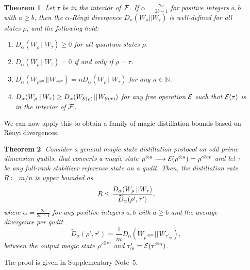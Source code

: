 \documentclass[
onecolumn,
superscriptaddress
]{revtex4-1}
\newtheorem{theorem}{Theorem}
\def\E{{\cal E}}
\def\F{{\cal F}}
\begin{document}
\begin{theorem}\label{thm:Da_props} 
	Let $\tau$ be in the interior of $\F$. 
	If $\alpha = \frac{2a}{2b-1}$ for positive integers $a,b$ with $a \geq b$, then the $\alpha$-R\'{e}nyi divergence $D_\alpha(W_\rho || W_\tau)$ is well-defined for all states $\rho$, and the following hold:
\begin{enumerate}
	\item $D_\alpha(W_\rho \hspace{1pt}||\hspace{1pt} W_\tau) \ge 0$ for all quantum states $\rho$.
	\item  $D_\alpha(W_\rho \hspace{1pt}||\hspace{1pt} W_\tau) = 0$ if and only if $\rho =\tau$.
	\item $D_\alpha(W_{\rho^{\otimes n}} \hspace{1pt}||\hspace{1pt} W_{\tau^{\otimes n}}) = n D_\alpha(W_\rho \hspace{1pt}||\hspace{1pt} W_\tau)$ for any $n \in \mathbb{N}$.
	\item $D_\alpha(W_\rho \hspace{1pt}||\hspace{1pt} W_\tau) \geq D_\alpha (W_{\E(\rho)} \hspace{1pt}||\hspace{1pt} W_{\E(\tau)})$ for any free operation $\E$ such that $\E(\tau)$ is in the interior of $\F$.
\end{enumerate}
\end{theorem}

We can now apply this to obtain a family of magic distillation bounds based on R\'{e}nyi divergences.

\begin{theorem}\label{thm:entropic_bounds}
	Consider a general magic state distillation protocol on odd prime dimension qudits, that converts a magic state $\rho^{\otimes n} \longrightarrow \E(\rho^{\otimes n})=\rho'^{\otimes m}$ and let $\tau$ be any full-rank stabilizer reference state on a qudit. Then, the distillation rate $R \coloneqq m/n$ is upper bounded as
	\begin{equation}
		R \leq \frac{D_{\alpha}(W_\rho \hspace{1pt}||\hspace{1pt} W_\tau)}{\rlap{\raisebox{-0.2ex}{$\widetilde{\phantom{D}}$}}D_\alpha( \rho', \tau')},
	\end{equation}
	where $\alpha = \frac{2a}{2b-1}$ for any positive integers $a,b$ with $a \geq b$ and the average divergence per qudit
	\begin{equation}
\widetilde{D}_\alpha( \rho', \tau') \coloneqq \frac{1}{m} D_\alpha (W_{\rho'^{\otimes m}} \hspace{1pt}||\hspace{1pt} W_{\tau'_m}),
\end{equation}
between the output magic state $\rho'^{\otimes m}$ and $\tau'_m = \E(\tau^{\otimes n})$.
\end{theorem}
The proof is given in Supplementary Note~5. 
\end{document}
